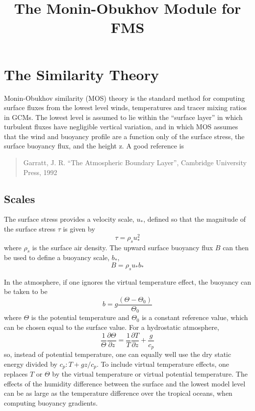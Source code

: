 \documentclass[12pt, letterpaper]{article}
\title{The Monin-Obukhov Module for FMS}
\date{}
\author{}
\begin{document}
\maketitle

\section{The Similarity Theory}

Monin-Obukhov similarity (MOS) theory is the standard method for
computing surface fluxes from the lowest level winds, temperatures and
tracer mixing ratios in GCMs.  The lowest level is assumed to lie
within the ``surface layer'' in which turbulent fluxes have negligible
vertical variation, and in which MOS assumes that the wind and
buoyancy profile are a function only of the surface stress, the
surface buoyancy flux, and the height z.  A good reference is
\begin{quote}
Garratt, J. R. ``The Atmospheric Boundary Layer'', Cambridge University Press, 1992
\end{quote}

\subsection{Scales}

The surface stress provides a velocity scale, $u_*$, defined so that
the magnitude of the surface stress $\tau$ is given by
\begin{equation}
  \tau = \rho_s u_*^2
\end{equation}
where $\rho_s$ is the surface air density.  The upward surface
buoyancy flux $B$ can then be used to define a buoyancy scale, $b_*$,
\begin{equation}
  B = \rho_s u_* b_*
\end{equation}

In the atmosphere, if one ignores the virtual temperature effect, the
buoyancy can be taken to be
\begin{equation}
  b = g \frac{(\Theta - \Theta_0)}{\Theta_0}
\end{equation}
where $\Theta$ is the potential temperature and $\Theta_0$ is a
constant reference value, which can be chosen equal to the surface
value.  For a hydrostatic atmosphere,
\begin{equation}
  \frac{1}{\Theta} \frac{\partial \Theta}{\partial z} = \frac{1}{T} \frac{\partial T}{\partial z} + \frac{g}{c_p}
\end{equation}
so, instead of potential temperature, one can equally well use the dry
static energy divided by $c_p: T + g z/c_p$.  To include virtual
temperature effects, one replaces $T$ or $\Theta$ by the virtual
temperature or virtual potential temperature.  The effects of the
humidity difference between the surface and the lowest model level can
be as large as the temperature difference over the tropical oceans,
when computing buoyancy gradients.
\end{document}
